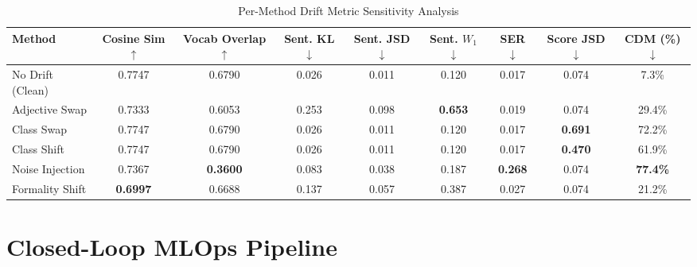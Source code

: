 \documentclass[conference]{IEEEtran}
\begin{document}
\begin{table}[t]
\caption{Per-Method Drift Metric Sensitivity Analysis}
\label{tab:sensitivity}
\centering
\begin{tabular}{lcccccccc}
\toprule
\textbf{Method} & \textbf{Cosine Sim} $\uparrow$ & \textbf{Vocab Overlap} $\uparrow$ & \textbf{Sent. KL} $\downarrow$ & \textbf{Sent. JSD} $\downarrow$ & \textbf{Sent. $W_1$} $\downarrow$ & \textbf{SER} $\downarrow$ & \textbf{Score JSD} $\downarrow$ & \textbf{CDM (\%)} $\downarrow$ \\
\midrule
No Drift (Clean) & 0.7747 & 0.6790 & 0.026 & 0.011 & 0.120 & 0.017 & 0.074 & 7.3\% \\
Adjective Swap & 0.7333 & 0.6053 & 0.253 & 0.098 & \textbf{0.653} & 0.019 & 0.074 & 29.4\% \\
Class Swap & 0.7747 & 0.6790 & 0.026 & 0.011 & 0.120 & 0.017 & \textbf{0.691} & 72.2\% \\
Class Shift & 0.7747 & 0.6790 & 0.026 & 0.011 & 0.120 & 0.017 & \textbf{0.470} & 61.9\% \\
Noise Injection & 0.7367 & \textbf{0.3600} & 0.083 & 0.038 & 0.187 & \textbf{0.268} & 0.074 & \textbf{77.4\%} \\
Formality Shift & \textbf{0.6997} & 0.6688 & 0.137 & 0.057 & 0.387 & 0.027 & 0.074 & 21.2\% \\
\bottomrule
\end{tabular}
\end{table}

\section{Closed-Loop MLOps Pipeline}
\end{document}
